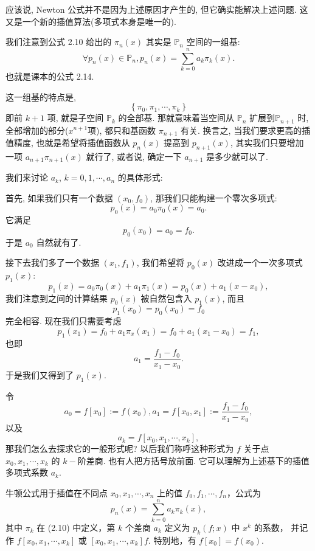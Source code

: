 \documentclass[a4paper]{ctexart}
\begin{document}
应该说, Newton 公式并不是因为上述原因才产生的, 但它确实能解决上述问题.
这又是一个新的插值算法(多项式本身是唯一的).

我们注意到公式 2.10 给出的 $\pi_n(x)$ 其实是 $\mathbb{P}_n$ 空间的一组基: 
$$
\forall p_n(x) \in \mathbb{P}_n, p_n(x) = \sum_{k = 0}^n a_k \pi_k(x).
$$
也就是课本的公式 2.14.

这一组基的特点是,
$$
\left\{\pi_0, \pi_1, \cdots, \pi_k\right\}
$$
即前 $k + 1$ 项, 就是子空间 $\mathbb{P}_k$ 的全部基. 那就意味着当空间从
$\mathbb{P}_n$ 扩展到$\mathbb{P}_{n + 1}$ 时, 全部增加的部分($x^{n + 1}项$),
都只和基函数 $\pi_{n + 1}$ 有关. 换言之, 当我们要求更高的插值精度, 也就是希望将插值函数从
$p_n(x)$ 提高到 $p_{n + 1}(x)$, 其实我们只要增加一项
$a_{n + 1}\pi_{n + 1}(x)$ 就行了, 或者说, 确定一下 $a_{n + 1}$ 是多少就可以了.

我们来讨论 $a_k$, $k = 0, 1, \cdots, a_n$
的具体形式:

首先, 如果我们只有一个数据 $(x_0, f_0)$, 那我们只能构建一个零次多项式:
$$
p_0(x) = a_0 \pi_0(x) = a_0. 
$$
它满足
$$
p_0(x_0) = a_0 = f_0.
$$
于是 $a_0$ 自然就有了.

接下去我们多了一个数据 $(x_1, f_1)$, 我们希望将 $p_0(x)$ 改进成一个一次多项式 $p_1(x)$:
$$
p_1(x) = a_0 \pi_0(x) + a_1 \pi_1(x) = p_0(x) + a_1 (x - x_0),
$$
我们注意到之间的计算结果 $p_0(x)$ 被自然包含入 $p_1(x)$, 而且
$$
p_1(x_0) = p_0(x_0) = f_0
$$
完全相容. 现在我们只需要考虑
$$
p_1(x_1) = f_0 + a_1 \pi_x(x_1) = f_0 + a_1 (x_1 - x_0) = f_1,
$$
也即
$$
a_1 = \frac{f_1 - f_0}{x_1 - x_0}.
$$
于是我们又得到了 $p_1(x)$.

令
$$
a_0 = f[x_0] := f(x_0), a_1 = f[x_0, x_1] := \frac{f_1 - f_0}{x_1 - x_0},
$$
以及
$$
a_k = f[x_0, x_1, \cdots, x_k],
$$
那我们怎么去探求它的一般形式呢? 以后我们称呼这种形式为 $f$ 关于点 $x_0, x_1, \cdots, x_k$
的 $k-$阶差商. 也有人把方括号放前面. 它可以理解为上述基下的插值多项式系数 $a_k$.

 牛顿公式用于插值在不同点 
$x_0, x_1, \cdots , x_n$ 上的值 $f_0 , f_1 , \cdots , f_n$，公式为
\[
p_n(x) = \sum_{k=0}^{n} a_k \pi_k(x), \tag{2.14}
\]
其中 $\pi_k$ 在 (2.10) 中定义，第 $k$ 个差商 $a_k$ 定义为 $p_k (f ; x)$ 中 $x^k$ 的系数，
并记作 $f [x_0 , x_1 , \cdots , x_k ]$ 或 $[x_0 , x_1 , \cdots , x_k ]f$.
特别地，有 $f [x_0 ] = f (x_0)$.
\end{document}
